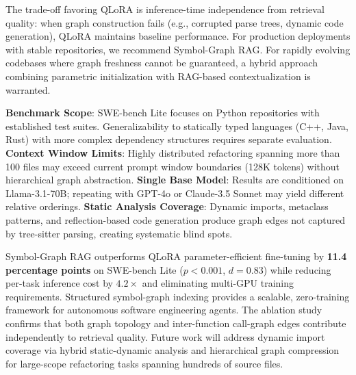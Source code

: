 \documentclass[10pt,twocolumn,letterpaper]{article}
\begin{document}
The trade-off favoring QLoRA is inference-time independence from retrieval quality: when graph construction fails (e.g., corrupted parse trees, dynamic code generation), QLoRA maintains baseline performance. For production deployments with stable repositories, we recommend Symbol-Graph RAG. For rapidly evolving codebases where graph freshness cannot be guaranteed, a hybrid approach combining parametric initialization with RAG-based contextualization is warranted.



\textbf{Benchmark Scope}: SWE-bench Lite focuses on Python repositories with established test suites. Generalizability to statically typed languages (C++, Java, Rust) with more complex dependency structures requires separate evaluation. \textbf{Context Window Limits}: Highly distributed refactoring spanning more than 100 files may exceed current prompt window boundaries (128K tokens) without hierarchical graph abstraction. \textbf{Single Base Model}: Results are conditioned on Llama-3.1-70B; repeating with GPT-4o or Claude-3.5 Sonnet may yield different relative orderings. \textbf{Static Analysis Coverage}: Dynamic imports, metaclass patterns, and reflection-based code generation produce graph edges not captured by tree-sitter parsing, creating systematic blind spots.



Symbol-Graph RAG outperforms QLoRA parameter-efficient fine-tuning by \textbf{11.4 percentage points} on SWE-bench Lite ($p < 0.001$, $d = 0.83$) while reducing per-task inference cost by $4.2\times$ and eliminating multi-GPU training requirements. Structured symbol-graph indexing provides a scalable, zero-training framework for autonomous software engineering agents. The ablation study confirms that both graph topology and inter-function call-graph edges contribute independently to retrieval quality. Future work will address dynamic import coverage via hybrid static-dynamic analysis and hierarchical graph compression for large-scope refactoring tasks spanning hundreds of source files. \cite{crossref_10_1201_9788743808145_14}


\par\vspace{0.5em}



\end{document}
